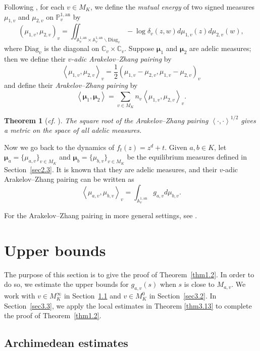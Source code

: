 \documentclass[10pt,a4paper]{amsart}
\numberwithin{equation}{section}
\theoremstyle{plain}
\newtheorem{thm}{Theorem}[section]
\theoremstyle{definition}
\theoremstyle{remark}
\newcommand{\A}{\mathbb A}
\newcommand{\C}{\mathbb C}
\newcommand{\PP}{\mathbb P}
\newcommand{\an}{\mathrm{an}}
\newcommand{\Diag}{\mathrm{Diag}}
\begin{document}
Following \cite[Sections 2.4 and 4.4]{FRL}, for each $v\in M_{K}$,
we define the \textit{mutual energy} of two signed measures $\mu_{1,v}$
and $\mu_{2,v}$ on $\PP_{v}^{1,\an}$ by
\[
\left(\mu_{1,v},\mu_{2,v}\right)_{v}=\iint_{\A_{v}^{1,\an}\times\A_{v}^{1,\an}\backslash\Diag_{v}}-\log\delta_{v}(z,w)d\mu_{1,v}(z)d\mu_{2,v}(w),
\]
where $\Diag_{v}$ is the diagonal on $\C_{v}\times\C_{v}$.
Suppose $\boldsymbol{\mu}_{1}$ and $\boldsymbol{\mu}_{2}$ are adelic
measures; then we define their \textit{$v$-adic Arakelov--Zhang
pairing} by
\[
\left\langle \mu_{1,v},\mu_{2,v}\right\rangle _{v}=\frac{1}{2}\left(\mu_{1,v}-\mu_{2,v},\mu_{1,v}-\mu_{2,v}\right)_{v} 
\]
and define their \textit{Arakelov--Zhang pairing} by
\[
\left\langle \boldsymbol{\mu}_{1},\boldsymbol{\mu}_{2}\right\rangle =\sum_{v\in M_{K}}n_{v}\left\langle \mu_{1,v},\mu_{2,v}\right\rangle _{v}.
\]

\begin{thm}[\textit{cf.} {\cite[Theorem 1]{Fi}}]\label{thm2.3}
The square root of the Arakelov--Zhang
pairing $\left\langle \cdot,\cdot\right\rangle ^{1/2}$ gives a metric
on the space of all adelic measures.
\end{thm}

Now we go back to the dynamics of $f_{t}(z)=z^{d}+t$. Given $a,b\in K$,
let $\boldsymbol{\mu}_{a}=\{\mu_{a,v}\}_{v\in M_{K}}$ and $\boldsymbol{\mu}_{b}=\{\mu_{b,v}\}_{v\in M_{K}}$
be the equilibrium measures defined in Section~\ref{sec2.3}. It is
known that they are adelic measures, and their $v$-adic Arakelov--Zhang
pairing can be written as
\[
\left\langle \mu_{a,v},\mu_{b,v}\right\rangle _{v}=\int_{\A_{v}^{1,\an}}g_{a,v}d\mu_{b,v}.
\]

For the Arakelov--Zhang pairing in more general settings,
see \cite{Zh,PST,CL2}.


\section{Upper bounds}\label{sec3}

The purpose of this section is to give the proof of Theorem~\ref{thm1.2}.
In order to do so, we estimate the upper bounds for $g_{a,v}(s)$
when $s$ is close to $M_{a,v}$. We work with $v\in M_{K}^{\infty}$
in Section~\ref{sec3.1} and $v\in M_{K}^{0}$ in Section~\ref{sec3.2}.
In Section~\ref{sec3.3}, we apply the local estimates in Theorem
\ref{thm3.13} to complete the proof of Theorem~\ref{thm1.2}.

\subsection{Archimedean estimates}\label{sec3.1}
\end{document}
